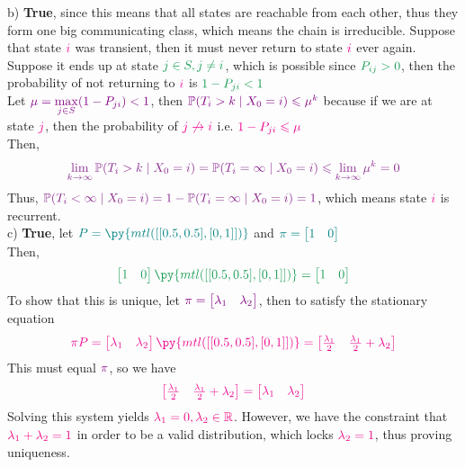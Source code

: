 \documentclass{solutionclass}
\renewcommand{\c}[1]{\color{#1}}
\newcommand{\mbb}[1]{\mathbb{#1}}
\newcommand{\f}[2]{\frac{#1}{#2}}
\newcommand{\tab}{ \hspace{3pt} }
\begin{document}
\begin{enumerate}
\begin{solution}[]
b)\tab \textbf{True}, since this means that all states are reachable from each other, thus they form one big communicating class, which means the chain is irreducible. Suppose that state $\c m i$ was transient, then it must never return to state $\c m i$ ever again. Suppose it ends up at state $\c g j \in S, j  \neq i$, which is possible since $\c g P_{ij} > 0$, then the probability of not returning to $\c m i$ is $\c g 1 - P_{ji} < 1$ \\

Let $\c{violet} \mu = \max\limits_{j \in S} (1-P_{ji}) < 1$, then $\c{violet} \mbb{P}(T_i > k \mid X_0 = i) \leqslant \mu^{k}$ because if we are at state $\c m j$, then the probability of $\c m j \not\to i$ i.e. $\c m 1-P_{ji} \leqslant \mu$ \\

Then, \[\c f \lim_{k \to \infty}  \mbb{P}(T_i > k \mid X_0 = i) =  \mbb{P}(T_i = \infty \mid X_0 = i) \leqslant \lim_{k \to \infty} \mu^k = 0\]
Thus, $\c f \mbb{P}(T_i < \infty \mid X_0 = i) = 1 - \mbb{P}(T_i = \infty \mid X_0 = i) = 1$, which means state $\c m i$ is recurrent. \\

c)\tab \textbf{True}, let $\c t P = \py{mtl([[0.5,0.5],[0,1]])}$ and $\c t \pi = \begin{bmatrix} 1 & 0 \end{bmatrix}$ \\
Then, 
\[\c g  \begin{bmatrix} 1 & 0 \end{bmatrix}  \py{mtl([[0.5,0.5],[0,1]])} =  \begin{bmatrix} 1 & 0 \end{bmatrix}\] 
To show that this is unique, let $\c{violet} \pi = \begin{bmatrix} \lambda_1 & \lambda_2 \end{bmatrix}$, then to satisfy the stationary equation
\[\c m \pi P =  \begin{bmatrix} \lambda_1 & \lambda_2 \end{bmatrix} \py{mtl([[0.5,0.5],[0,1]])} = \begin{bmatrix} \f{\lambda_1}{2} & \f{\lambda_1}{2} + \lambda_2 \end{bmatrix} \]
This must equal $\c{violet} \pi$, so we have
\[\c m \begin{bmatrix} \f{\lambda_1}{2} & \f{\lambda_1}{2} + \lambda_2 \end{bmatrix} =  \begin{bmatrix} \lambda_1 & \lambda_2 \end{bmatrix} \]
Solving this system yields $\c r \lambda_1 = 0, \lambda_2 \in \mbb{R}$. However, we have the constraint that $\c r \lambda_1 + \lambda_2 = 1$ in order to be a valid distribution, which locks $\c r \lambda_2 = 1$, thus proving uniqueness.

\end{solution}

\end{enumerate}


 
\end{document}
